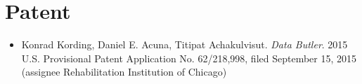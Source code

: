 \section{\sc Patent}

\begin{itemize}[leftmargin=0cm, label={}]

\item Konrad Kording, Daniel E. Acuna, Titipat Achakulvisut. {\em Data Butler}. 		\hfill 2015\\
U.S. Provisional Patent Application No. 62/218,998, filed September 15, 2015\\ (assignee Rehabilitation Institution of Chicago)

\end{itemize}
